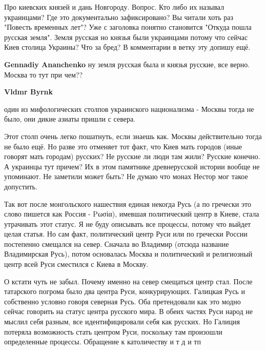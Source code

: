 \begin{itemize}
Про киевских князей и дань Новгороду. Вопрос. Кто либо их называл украинцами?
Где это документально зафиксировано? Вы читали хоть раз "Повесть временных
лет"? Уже с заголовка понятно становится "Откуда пошла русская земля". Земля
русская но князья были украинцами потому что сейчас Киев столица Украины? Что
за бред? В комментарии в ветку эту допишу ещё.

\begin{itemize}
 
\textbf{Gennadiy Ananchenko} ну земля русская была и князья русские, все верно. Москва то тут при чем??

 
\textbf{Vldmr Byrnk} 

один из мифологических столпов украинского национализма - Москвы тогда не было,
они дикие азиаты пришли с севера.

Этот столп очень легко пошатнуть, если знаешь как. Москвы действительно тогда
не было ещё. Но разве это отменяет тот факт, что Киев мать городов (иные
говорят мать городам) русских? Не русские ли люди там жили? Русские конечно. А
украинцы тут причем? Их в этом памятнике древнерусской истории вообще не
упоминают. Не заметили может быть? Не думаю что монах Нестор мог такое
допустить.

Так вот после монгольского нашествия единая некогда Русь (а по гречески это
слово пишется как Россия - Ρωσία), имевшая политический центр в Киеве, стала
утрачивать этот статус. Я не буду описывать все процессы, потому что выйдет
целая статья. Но сам факт, политический центр Руси или по гречески России
постепенно смещался на север. Сначала во Владимир (отсюда название Владимирская
Русь), потом основалась Москва и политический и религиозный центр всей Руси
сместился с Киева в Москву.

О кстати чуть не забыл. Почему именно на север смещаться центр стал. После
татарского погрома было два центра Руси, конкурирующих. Галицкая Русь и
собственно условно говоря северная Русь. Оба претендовали как это модно сейчас
говорить на статус центра русского мира. В обеих частях Руси народ не мыслил
себя разным, все идентифицировали себя как русских. Но Галиция потеряла
возможность стать центром Руси, поскольку там произошли определенные процессы.
Обращение к католичеству и т д и тп


\end{itemize}
\end{itemize}
